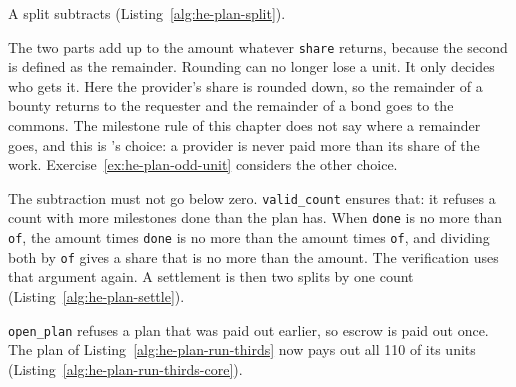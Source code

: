
A split subtracts (Listing~\ref{alg:he-plan-split}).


The two parts add up to the amount whatever \texttt{share} returns,
because the second is defined as the remainder. Rounding can no longer
lose a unit. It only decides who gets it. Here the provider's share is
rounded down, so the remainder of a bounty returns to the requester and
the remainder of a bond goes to the commons. The milestone rule of this
chapter does not say where a remainder goes, and this is
\pdkernelname{}'s choice: a provider is never paid more than its share of
the work. Exercise~\ref{ex:he-plan-odd-unit} considers the other choice.

The subtraction must not go below zero. \texttt{valid\_count} ensures
that: it refuses a count with more milestones done than the plan has. When
\texttt{done} is no more than \texttt{of}, the amount times \texttt{done}
is no more than the amount times \texttt{of}, and dividing both by
\texttt{of} gives a share that is no more than the amount. The
verification uses that argument again. A settlement is then two splits by
one count (Listing~\ref{alg:he-plan-settle}).


\texttt{open\_plan} refuses a plan that was paid out earlier, so escrow is
paid out once. The plan of Listing~\ref{alg:he-plan-run-thirds} now pays
out all 110 of its units (Listing~\ref{alg:he-plan-run-thirds-core}).



